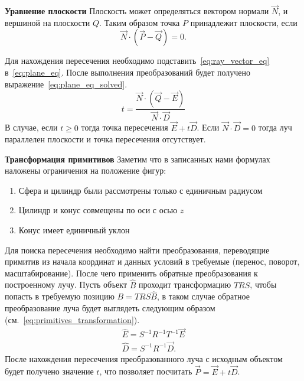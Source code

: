 \textbf{Уравнение плоскости}
Плоскость может определяться вектором нормали $\vec{N}$, и вершиной на плоскости $Q$. Таким образом точка $P$ принадлежит плоскости, если 
\begin{equation}
	\vec{N} \cdot (\vec{P} - \vec{Q}) = 0.
	\label{eq:plane_eq}
\end{equation}

Для нахождения пересечения необходимо подставить~\ref{eq:ray_vector_eq} в~\ref{eq:plane_eq}. После выполнения преобразований будет получено
выражение~\ref{eq:plane_eq_solved}.
\begin{equation}
	t=\frac{\vec{N} \cdot (\vec{Q} - \vec{E})}{\vec{N} \cdot \vec{D}}
	\label{eq:plane_eq_solved}
\end{equation}
В случае, если $t \ge 0$ тогда точка пересечения $\vec{E} + t\vec{D}$. Если $\vec{N} \cdot \vec{D} = 0$ тогда луч параллелен плоскости и
точка пересечения отсутствует.\cite{primitives_raytracing_equations}


\textbf{Трансформация примитивов}
Заметим что в записанных нами формулах наложены ограничения на положение фигур:
\begin{enumerate}
	\item Сфера и цилиндр были рассмотрены только с единичным радиусом
	\item Цилиндр и конус совмещены по оси с осью $z$
	\item Конус имеет единичный уклон
\end{enumerate}
Для поиска пересечения необходимо найти преобразования, переводящие примитив из начала координат и данных условий в требуемые (перенос, поворот, масштабирование).
После чего применить обратные преобразования к построенному лучу.
Пусть объект $\hat{B}$ проходит трансформацию $TRS$, чтобы попасть в требуемую позицию $B = TRS\hat{B}$, в таком случае обратное преобразование луча будет выглядеть
следующим образом (см.~\ref{eq:primitives_transformation}).
\begin{equation}
	\label{eq:primitives_transformation}
	\begin{aligned}
		\hat{E} = S^{-1}R^{-1}T^{-1}\vec{E}\\
		\hat{D} = S^{-1}R^{-1}\vec{D}.
	\end{aligned}
\end{equation}
После нахождения пересечения преобразованного луча с исходным объектом будет получено значение $t$, что позволяет посчитать $\vec{P} = \vec{E} +t\vec{D}$.

